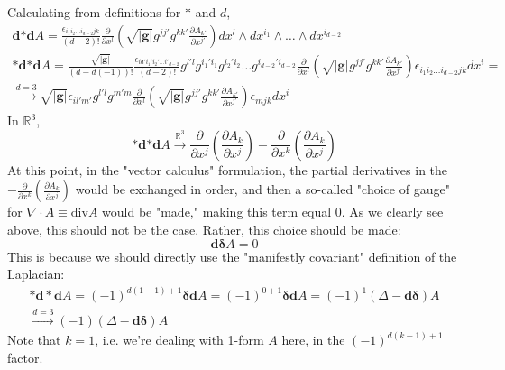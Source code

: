 \documentclass[10pt]{amsart}
\begin{document}
\begin{multicols*}{2}
Calculating from definitions for $*$ and $d$, 
\[
\begin{gathered}
	\mathbf{d} \mathbf{*} \mathbf{d} A = \frac{ \epsilon_{i_1 i_2 \dots i_{d-2} jk } }{ (d-2)! } \frac{ \partial }{ \partial x^l} \left( \sqrt{|\mathbf{g} |} g^{jj'} g^{kk'} \frac{ \partial A_{k'} }{ \partial x^{j'} } \right) dx^l \wedge dx^{i_1} \wedge \dots \wedge dx^{i_{d-2} } \\ 
	\mathbf{*} \mathbf{d} \mathbf{*} \mathbf{d} A = \frac{ \sqrt{ |\mathbf{g} | } }{ (d-d(-1))! } \frac{ \epsilon_{id'i_1' i_2' \dots i'_{d-2} } }{ (d-2)! } g^{l'l} g^{i_1' i_1} g^{i_2' i_2} \dots g^{i_{d-2}' i_{d-2} } \frac{ \partial }{ \partial x^l } \left( \sqrt{ |\mathbf{g} | } g^{jj'} g^{kk'} \frac{ \partial A_{k'} }{ \partial x^{j'} } \right) \epsilon_{i_1 i_2 \dots i_{d-2} jk } dx^i = \\
\xrightarrow{d=3} \sqrt{ |\mathbf{g} | } \epsilon_{il'm'} g^{l'l} g^{m'm} \frac{ \partial }{ \partial x^l} \left( \sqrt{ |\mathbf{g} | } g^{jj'} g^{kk'} \frac{ \partial A_{k'} }{ \partial x^{j'} } \right) \epsilon_{mjk} dx^i
\end{gathered}
\]
In $\mathbb{R}^3$, 
\[
\mathbf{*} \mathbf{d} \mathbf{*} \mathbf{d} A \xrightarrow{ \mathbb{R}^3} \frac{ \partial }{ \partial x^j} \left( \frac{ \partial A_k }{ \partial x^j} \right) - \frac{ \partial }{ \partial x^k} \left( \frac{ \partial A_k}{ \partial x^j} \right)
\]
At this point, in the "vector calculus" formulation, the partial derivatives in the $- \frac{ \partial }{ \partial x^k} \left( \frac{ \partial A_k}{ \partial x^j} \right)$ would be exchanged in order, and then a so-called "choice of gauge" for $\nabla \cdot A \equiv \text{div}A$ would be "made," making this term equal $0$.  As we clearly see above, this should not be the case.  Rather, this choice should be made:
\begin{equation}
\mathbf{d \delta } A = 0
\end{equation}
This is because we should directly use the "manifestly covariant" definition of the Laplacian:
\begin{equation}
\begin{gathered}
	\mathbf{* d * d } A = (-1)^{d(1-1) +1} \mathbf{ \delta d} A = (-1)^{0+1} \mathbf{ \delta d } A = (-1)^{1} (\Delta - \mathbf{d\delta } ) A \\
\xrightarrow{ d=3} (-1)(\Delta - \mathbf{ d\delta } ) A	
\end{gathered}
\end{equation}
Note that $k=1$, i.e. we're dealing with 1-form $A$ here, in the $(-1)^{d(k-1)+1}$ factor.  


\end{multicols*}
\end{document}
